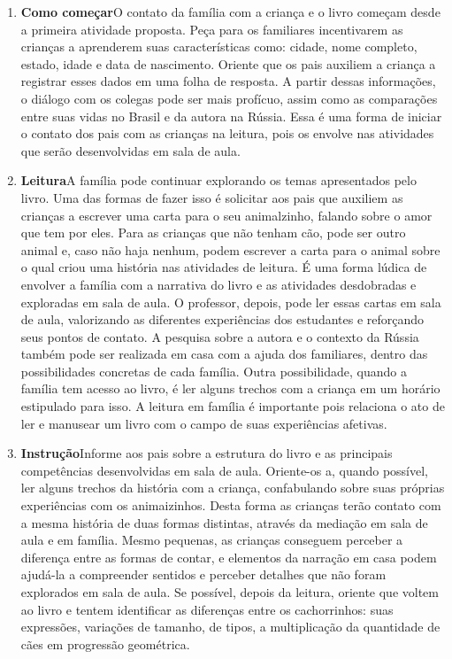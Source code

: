 \documentclass[11pt]{extarticle}
\begin{document}
\begin{enumerate}
\item \textbf{Como começar}\quad O contato da família com a criança e o livro começam desde a primeira atividade proposta. Peça para os familiares incentivarem as crianças a aprenderem suas características como: cidade, nome completo, estado, idade e data de nascimento. Oriente que os pais auxiliem a criança a registrar esses dados em uma folha de resposta. A partir dessas informações, o diálogo com os colegas pode ser mais profícuo, assim como as comparações entre suas vidas no Brasil e da autora na Rússia. Essa é uma forma de iniciar o contato dos pais com as crianças na leitura, pois os envolve nas atividades que serão desenvolvidas em sala de aula.

\item \textbf{Leitura}\quad A família pode continuar 
explorando os temas apresentados pelo livro. Uma das formas de fazer isso é solicitar aos pais que auxiliem as crianças a escrever uma carta para o seu animalzinho, falando sobre o amor que tem por eles. Para as crianças que não tenham cão, pode ser outro animal e, caso não haja nenhum, podem escrever a carta para o animal sobre o qual criou uma história nas atividades de leitura. É uma forma lúdica de envolver a família com a narrativa do livro e as atividades desdobradas e exploradas em sala de aula. O professor, depois, pode ler essas cartas em sala de aula, valorizando as diferentes experiências dos estudantes e reforçando seus pontos de contato. A pesquisa sobre a autora e o contexto da Rússia também pode ser realizada em casa com a ajuda dos familiares, dentro das possibilidades concretas de cada família. Outra possibilidade, quando a família tem acesso ao livro, é ler alguns trechos com a criança em um horário estipulado para isso. A leitura em família é importante pois relaciona o ato de ler e manusear um livro com o campo de suas experiências afetivas.

\item \textbf{Instrução}\quad Informe aos pais sobre a estrutura do livro e as principais competências desenvolvidas em sala de aula.
Oriente-os a, quando possível, ler alguns trechos da história com a criança, confabulando sobre suas próprias experiências com os animaizinhos.
Desta forma as crianças terão contato com a mesma história de duas formas distintas, através da mediação em sala de aula e em família. 
Mesmo pequenas, as crianças conseguem perceber a diferença entre 
as formas de contar, e elementos da narração em casa podem ajudá-la a compreender 
sentidos e perceber detalhes que não foram explorados em sala de aula. Se possível, depois da leitura, oriente 
que voltem ao livro e tentem identificar as diferenças entre os cachorrinhos: suas expressões, variações de tamanho, de tipos, a multiplicação da quantidade de cães em progressão geométrica.


\end{enumerate}
\end{document}
